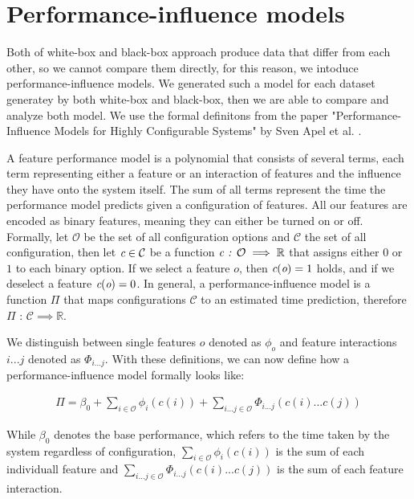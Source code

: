 \section{Performance-influence models}\label{ch:performance-influence-models}

Both of white-box and black-box approach produce data that differ from each other, so we cannot compare them directly, for 
this reason, we intoduce performance-influence models. We generated such a model for each dataset generatey by both white-box and black-box, then
we are able to compare and analyze both model. We use the formal definitons from the paper "Performance-Influence Models for
Highly Configurable Systems" by Sven Apel et al. \cite{Performance-influence-models-for-highly-configurable-systems}.

A feature performance model is a polynomial that consists of several terms, each term representing either a feature or an interaction
of features and the influence they have onto the system itself. The sum of all terms represent the time the performance model predicts
given a configuration of features. All our features are encoded as binary features, meaning they can either be turned on or off. Formally, 
let $\mathcal{O}$ be the set of all configuration options and $\mathcal{C}$ the set of all configuration, then  let $\emph{c} \in \mathcal{C}$ be
a function $\emph{c} \textit{ : } \mathcal{O} \implies \mathbb{R}$ that assigns either $0$ or $1$ to each binary option. If we select a feature
$o$, then $\emph{c}(\emph{o}) = 1$ holds, and if we deselect a feature $\emph{c}(\emph{o}) = 0$. In general, a performance-influence
model is a function $\Pi$ that maps configurations $\mathcal{C}$ to an estimated time prediction, therefore $\Pi \textit{ : } \mathcal{C} \implies \mathbb{R}$.

We distinguish between single features $o$ denoted as $\phi_o$ and feature interactions $i ... j$ denoted as $\Phi_{i...j}$. With these
definitions, we can now define how a performance-influence model formally looks like:

\begin{gather}
    \Pi = \beta_0 + \sum_{i \in \mathcal{O}} \phi_i(c(i)) + \sum_{i...j \in \mathcal{O}} \Phi_{i...j}(c(i)...c(j))
\end{gather}

While $\beta_0$ denotes the base performance, which refers to the time taken by the system regardless of configuration, $\sum_{i \in \mathcal{O}} \phi_i(c(i))$
is the sum of each individuall feature and $\sum_{i...j \in \mathcal{O}} \Phi_{i...j}(c(i)...c(j))$ is the sum of each feature interaction.


